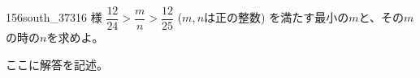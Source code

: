 \begin{prob}{156}{}{south\_37316 様}
 $\dfrac{12}{24}>\dfrac{m}{n}>\dfrac{12}{25}$ ($m, n$は正の整数) を満たす最小の$m$と、その$m$の時の$n$を求めよ。
\end{prob}
ここに解答を記述。